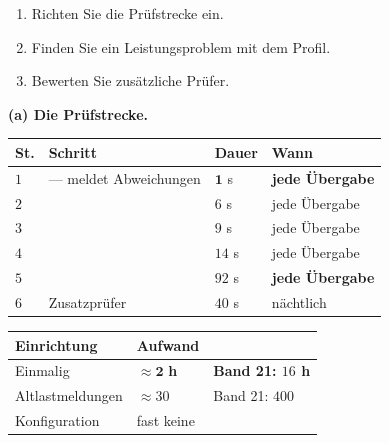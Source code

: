 \begin{aufgabe}
\begin{enumerate}[label=(\alph*)]
\item Richten Sie die Prüfstrecke ein.
\item Finden Sie ein Leistungsproblem mit dem Profil.
\item Bewerten Sie zusätzliche Prüfer.
\end{enumerate}

\loesung
\textbf{(a) Die Prüfstrecke.}

\begin{center}
{\small
\renewcommand{\arraystretch}{1.45}
\begin{tabular}{@{}P{1.0cm}P{3.4cm}P{1.8cm}P{2.2cm}@{}}
\toprule
\textbf{St.} & \textbf{Schritt} & \textbf{Dauer} & \textbf{Wann}\\
\midrule
$1$ &  --- meldet Abweichungen & $\mathbf{1}$ s & \textbf{jede Übergabe}\\
$2$ &  & $6$ s & jede Übergabe\\
$3$ &  & $9$ s & jede Übergabe\\
$4$ &  & $14$ s & jede Übergabe\\
$5$ & \textbf{} & $92$ s & \textbf{jede Übergabe}\\
$6$ & Zusatzprüfer & $40$ s & nächtlich\\
\bottomrule
\end{tabular}}
\end{center}

\begin{center}
\begin{minipage}{0.88\textwidth}
\end{minipage}
\end{center}

\begin{center}
\renewcommand{\arraystretch}{1.45}
\begin{tabular}{@{}P{3.0cm}P{2.2cm}P{2.8cm}@{}}
\toprule
\textbf{Einrichtung} & \textbf{Aufwand} & \\
\midrule
Einmalig & \textcolor{gruen}{$\approx\mathbf{2}$ \textbf{h}} & \textbf{Band 21: $16$ h}\\
Altlast\-meldungen & \textcolor{gruen}{$\approx30$} & \textcolor{gruen}{Band 21: $400$}\\
Konfiguration & \textcolor{gruen}{fast keine} & \\
\bottomrule
\end{tabular}
\end{center}


\end{aufgabe}
